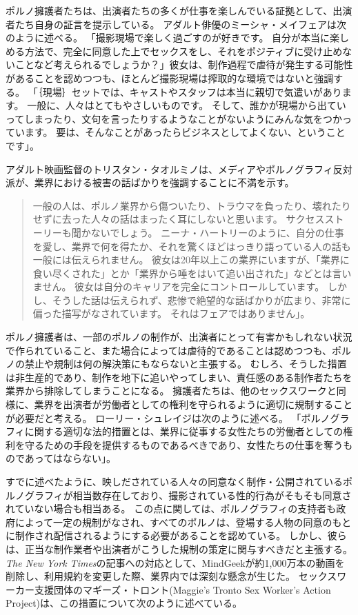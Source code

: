 \documentclass[paper=a4,book,openany]{jlreq}
\begin{document}
ポルノ擁護者たちは、出演者たちの多くが仕事を楽しんでいる証拠として、出演者たち自身の証言を提示している。
アダルト俳優のミーシャ・メイフェアは次のように述べる。
「撮影現場で楽しく過ごすのが好きです。
自分が本当に楽しめる方法で、完全に同意した上でセックスをし、それをポジティブに受け止めないことなど考えられるでしょうか？」彼女は、制作過程で虐待が発生する可能性があることを認めつつも、ほとんど撮影現場は搾取的な環境ではないと強調する。
「｛現場｝{セット}では、キャストやスタッフは本当に親切で気遣いがあります。
一般に、人々はとてもやさしいものです。
そして、誰かが現場から出ていってしまったり、文句を言ったりするようなことがないようにみんな気をつかっています。
要は、そんなことがあったらビジネスとしてよくない、ということです」\citep{sisley19:_common_myths_porn_debun_porn_perfor}。

アダルト映画監督のトリスタン・タオルミノは、メディアやポルノグラフィ反対派が、業界における被害の話ばかりを強調することに不満を示す。

\begin{quote}
一般の人は、ポルノ業界から傷ついたり、トラウマを負ったり、壊れたりせずに去った人々の話はまったく耳にしないと思います。
サクセスストーリーも聞かないでしょう。
ニーナ・ハートリーのように、自分の仕事を愛し、業界で何を得たか、それを驚くほどはっきり語っている人の話も一般には伝えられません。
彼女は20年以上この業界にいますが、「業界に食い尽くされた」とか「業界から唾をはいて追い出された」などとは言いません。
彼女は自分のキャリアを完全にコントロールしています。
しかし、そうした話は伝えられず、悲惨で絶望的な話ばかりが広まり、非常に偏った描写がなされています。
それはフェアではありません」。
\citep{sachs12:_inter_femin_pornog}
\end{quote}

ポルノ擁護者は、一部のポルノの制作が、出演者にとって有害かもしれない状況で作られていること、また場合によっては虐待的であることは認めつつも、ポルノの禁止や規制は何の解決策にもならないと主張する。
むしろ、そうした措置は非生産的であり、制作を地下に追いやってしまい、責任感のある制作者たちを業界から排除してしまうことになる。
擁護者たちは、他のセックスワークと同様に、業界を出演者が労働者としての権利を守られるように適切に規制することが必要だと考える。
ローリー・シュレイジは次のように述べる。
「ポルノグラフィに関する適切な法的措置とは、業界に従事する女性たちの労働者としての権利を守るための手段を提供するものであるべきであり、女性たちの仕事を奪うものであってはならない」\citep[p.58]{shrage05:_expos_fallac_anti_femin}。

すでに述べたように、映しだされている人々の同意なく制作・公開されているポルノグラフィが相当数存在しており、撮影されている性的行為がそもそも同意されていない場合も相当ある。
この点に関しては、ポルノグラフィの支持者も政府によって一定の規制がなされ、すべてのポルノは、登場する人物の同意のもとに制作され配信されるようにする必要があることを認めている。
しかし、彼らは、正当な制作業者や出演者がこうした規制の策定に関与すべきだと主張する。
\emph{The New York Times}の記事への対応として、MindGeekが約1,000万本の動画を削除し、利用規約を変更した際、業界内では深刻な懸念が生じた。
セックスワーカー支援団体のマギーズ・トロント(Maggie's Tronto Sex Worker's Action Project)は、この措置について次のように述べている。
\end{document}
